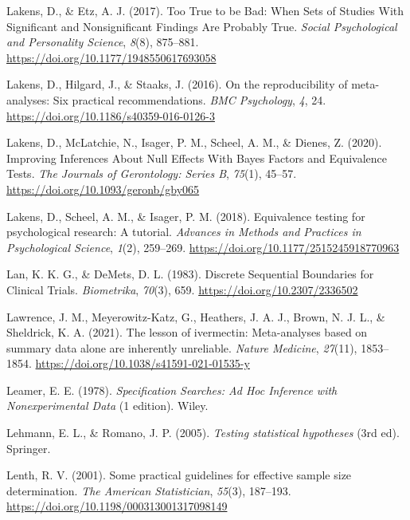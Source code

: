 \documentclass[
  oneside]{krantz}
\newlength{\cslhangindent}
\newlength{\cslentryspacingunit} %
\newenvironment{CSLReferences}[2] %
 {%
  \setlength{\parindent}{0pt}
  \ifodd #1
  \let\oldpar\par
  \def\par{\hangindent=\cslhangindent\oldpar}
  \fi
  \setlength{\parskip}{#2\cslentryspacingunit}
 }%
 {}
\begin{document}
\begin{CSLReferences}{1}{0}
\leavevmode{}%
Lakens, D., \& Etz, A. J. (2017). Too {True} to be {Bad}: {When Sets} of
{Studies With Significant} and {Nonsignificant Findings Are Probably
True}. \emph{Social Psychological and Personality Science}, \emph{8}(8),
875--881. \url{https://doi.org/10.1177/1948550617693058}

\leavevmode{}%
Lakens, D., Hilgard, J., \& Staaks, J. (2016). On the reproducibility of
meta-analyses: Six practical recommendations. \emph{BMC Psychology},
\emph{4}, 24. \url{https://doi.org/10.1186/s40359-016-0126-3}

\leavevmode{}%
Lakens, D., McLatchie, N., Isager, P. M., Scheel, A. M., \& Dienes, Z.
(2020). Improving {Inferences About Null Effects With Bayes Factors} and
{Equivalence Tests}. \emph{The Journals of Gerontology: Series B},
\emph{75}(1), 45--57. \url{https://doi.org/10.1093/geronb/gby065}

\leavevmode{}%
Lakens, D., Scheel, A. M., \& Isager, P. M. (2018). Equivalence testing
for psychological research: {A} tutorial. \emph{Advances in Methods and
Practices in Psychological Science}, \emph{1}(2), 259--269.
\url{https://doi.org/10.1177/2515245918770963}

\leavevmode{}%
Lan, K. K. G., \& DeMets, D. L. (1983). Discrete {Sequential Boundaries}
for {Clinical Trials}. \emph{Biometrika}, \emph{70}(3), 659.
\url{https://doi.org/10.2307/2336502}

\leavevmode{}%
Lawrence, J. M., Meyerowitz-Katz, G., Heathers, J. A. J., Brown, N. J.
L., \& Sheldrick, K. A. (2021). The lesson of ivermectin: Meta-analyses
based on summary data alone are inherently unreliable. \emph{Nature
Medicine}, \emph{27}(11), 1853--1854.
\url{https://doi.org/10.1038/s41591-021-01535-y}

\leavevmode{}%
Leamer, E. E. (1978). \emph{Specification {Searches}: {Ad Hoc Inference}
with {Nonexperimental Data}} (1 edition). {Wiley}.

\leavevmode{}%
Lehmann, E. L., \& Romano, J. P. (2005). \emph{Testing statistical
hypotheses} (3rd ed). {Springer}.

\leavevmode{}%
Lenth, R. V. (2001). Some practical guidelines for effective sample size
determination. \emph{The American Statistician}, \emph{55}(3), 187--193.
\url{https://doi.org/10.1198/000313001317098149}


\end{CSLReferences}
\end{document}
